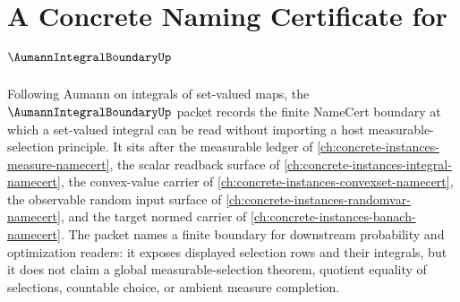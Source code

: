 \chapter{A Concrete Naming Certificate for $\AumannIntegralBoundaryUp$}
\label{ch:concrete-instances-aumann-integral-boundary-namecert}

Following Aumann on integrals of set-valued maps, the $\AumannIntegralBoundaryUp$ packet records the finite NameCert boundary at which a set-valued integral can be read without importing a host measurable-selection principle. It sits after the measurable ledger of \autoref{ch:concrete-instances-measure-namecert}, the scalar readback surface of \autoref{ch:concrete-instances-integral-namecert}, the convex-value carrier of \autoref{ch:concrete-instances-convexset-namecert}, the observable random input surface of \autoref{ch:concrete-instances-randomvar-namecert}, and the target normed carrier of \autoref{ch:concrete-instances-banach-namecert}. The packet names a finite boundary for downstream probability and optimization readers: it exposes displayed selection rows and their integrals, but it does not claim a global measurable-selection theorem, quotient equality of selections, countable choice, or ambient measure completion.

